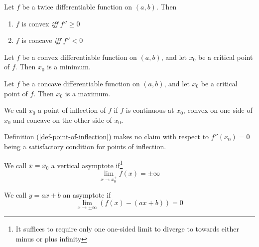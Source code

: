 \begin{thm}\label{thm-convex-concave-second-derivative}
	Let $f$ be a twice differentiable function on $(a,b)$. Then
	\begin{enumerate}
		\item $f$ is convex \textit{iff} $f''\geq0$
		\item $f$ is concave \textit{iff} $f''<0$
	\end{enumerate}
\end{thm}

\begin{thm}\label{thm-convex-minimum}
	Let $f$ be a convex differentiable function on $(a,b)$, and let $x_0$ be a
	critical point of $f$. Then $x_0$ is a minimum.
\end{thm}

\begin{thm}\label{thm-concave-maximum}
	Let $f$ be a concave differentiable function on $(a,b)$, and let $x_0$ be a
	critical point of $f$. Then $x_0$ is a maximum.
\end{thm}

\begin{definition}\label{def-point-of-inflection}
	We call $x_0$ a point of inflection of $f$ if $f$ is continuous at $x_0$,
	convex on one side of $x_0$ and concave on the other side of $x_0$.
\end{definition}

\begin{rem}\label{rem-point-of-inflection}
	Definition (\ref{def-point-of-inflection}) makes no claim with respect to
	$f''(x_0)=0$ being a satisfactory condition for points of inflection.
\end{rem}

\begin{definition}\label{def-vertical-asymptotes}
	We call $x=x_0$ a vertical asymptote if\footnote{It suffices to require only
		one one-sided limit to diverge to towards either minus or plus infinity}
	\begin{equation}\label{eq-vertical-asymptotes:1}
		\lim_{x \to x_0^+}f(x)= \pm\infty
	\end{equation}
\end{definition}

\begin{definition}\label{def-asymptotes}
	We call $y=ax+b$ an asymptote if
	\begin{equation}\label{eq-asymptotes}
		\lim_{x \to \pm\infty}\left(f(x)-(ax+b)\right)=0
	\end{equation}
\end{definition}

